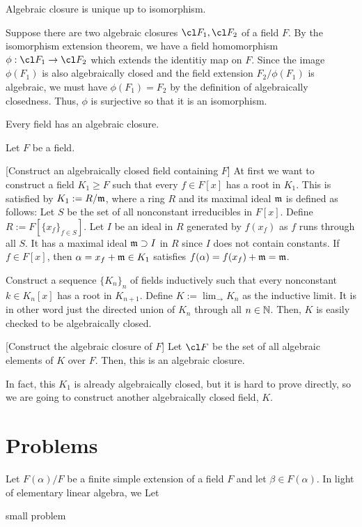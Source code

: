 \documentclass{../note}
\begin{document}
\begin{thm}
Algebraic closure is unique up to isomorphism.
\end{thm}
\begin{pf}
Suppose there are two algebraic closures $\cl F_1, \cl F_2$ of a field $F$.
By the isomorphism extension theorem, we have a field homomorphism $\phi:\cl F_1\to\cl F_2$ which extends the identitiy map on $F$.
Since the image $\phi(F_1)$ is also algebraically closed and the field extension $F_2/\phi(F_1)$ is algebraic, we must have $\phi(F_1)=F_2$ by the definition of algebraically closedness.
Thus, $\phi$ is surjective so that it is an isomorphism.
\end{pf}

\begin{thm}
Every field has an algebraic closure.
\end{thm}
\begin{pf}
Let $F$ be a field.

[Construct an algebraically closed field containing $F$]
At first we want to construct a field $K_1\ge F$ such that every $f\in F[x]$ has a root in $K_1$.
This is satisfied by $K_1:=R/\mathfrak{m}$, where a ring $R$ and its maximal ideal $\mathfrak{m}$ is defined as follows:
Let $S$ be the set of all nonconstant irreducibles in $F[x]$.
Define $R:=F[\{x_f\}_{f\in S}]$.
Let $I$ be an ideal in $R$ generated by $f(x_f)$ as $f$ runs through all $S$.
It has a maximal ideal $\mathfrak{m}\supset I$ in $R$ since $I$ does not contain constants.
If $f\in F[x]$, then $\alpha=x_f+\mathfrak{m}\in K_1$ satisfies $f(\alpha)=f(x_f)+\mathfrak{m}=\mathfrak{m}$.

Construct a sequence $\{K_n\}_n$ of fields inductively such that every nonconstant $k\in K_n[x]$ has a root in $K_{n+1}$.
Define $K:=\lim_{\to}K_n$ as the inductive limit.
It is in other word just the directed union of $K_n$ through all $n\in\mathbb{N}$.
Then, $K$ is easily checked to be algebraically closed.

[Construct the algebraic closure of $F$]
Let $\cl F$ be the set of all algebraic elements of $K$ over $F$.
Then, this is an algebraic closure.
\end{pf}
\begin{rmk}
In fact, this $K_1$ is already algebraically closed, but it is hard to prove directly, so we are going to construct another algebraically closed field, $K$.
\end{rmk}




\section*{Problems}
\begin{prb}
Let $F(\alpha)/F$ be a finite simple extension of a field $F$ and let $\beta\in F(\alpha)$.
In light of elementary linear algebra, we 
Let
\begin{parts}
\item 
\item small problem
\end{parts}
\end{prb}
\end{document}
